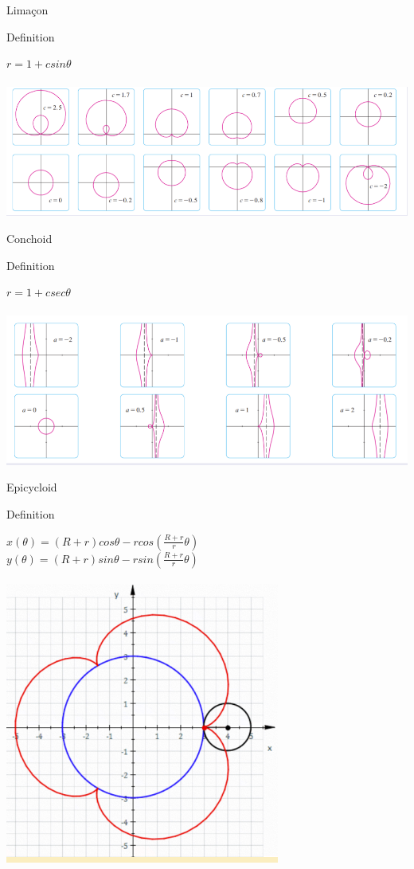 \documentclass{beamer}
\begin{document}
\begin{frame}{Limaçon}
    \begin{block}{Definition}
    \begin{center}
        $r=1+c sin\theta$\\~\\
        \includegraphics[width=0.85\linewidth]{limacon.png}
    \end{center}
    \end{block}
\end{frame}
\begin{frame}{Conchoid}
    \begin{block}{Definition}
    \begin{center}
        $r=1+c sec\theta$\\~\\
        \includegraphics[width=0.85\linewidth]{Conchoid.png}
    \end{center}
    \end{block}
\end{frame}
\begin{frame}{Epicycloid}
    \begin{block}{Definition}
    \begin{center}
        $x(\theta)=(R+r)cos\theta-r cos(\frac{R+r}{r}\theta)$\\
        $y(\theta)=(R+r)sin\theta-r sin(\frac{R+r}{r}\theta)$\\~\\
        \includegraphics[width=0.55\linewidth]{Epicycloid.png}
    \end{center}
    \end{block}
\end{frame}
\end{document}
